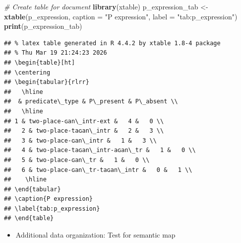\documentclass[
]{article}
\newenvironment{Shaded}{\begin{snugshade}}{\end{snugshade}}
\newcommand{\AttributeTok}[1]{\textcolor[rgb]{0.13,0.29,0.53}{#1}}
\newcommand{\CommentTok}[1]{\textcolor[rgb]{0.56,0.35,0.01}{\textit{#1}}}
\newcommand{\FunctionTok}[1]{\textcolor[rgb]{0.13,0.29,0.53}{\textbf{#1}}}
\newcommand{\NormalTok}[1]{#1}
\newcommand{\OtherTok}[1]{\textcolor[rgb]{0.56,0.35,0.01}{#1}}
\newcommand{\StringTok}[1]{\textcolor[rgb]{0.31,0.60,0.02}{#1}}
\providecommand{\tightlist}{%
  \setlength{\itemsep}{0pt}\setlength{\parskip}{0pt}}
\begin{document}
\begin{Shaded}
\begin{Highlighting}[]
\CommentTok{\# Create table for document}
\FunctionTok{library}\NormalTok{(xtable) }
\NormalTok{p\_expression\_tab }\OtherTok{\textless{}{-}} \FunctionTok{xtable}\NormalTok{(p\_expression,}
             \AttributeTok{caption =} \StringTok{"P expression"}\NormalTok{,}
             \AttributeTok{label   =} \StringTok{"tab:p\_expression"}\NormalTok{)}
\FunctionTok{print}\NormalTok{(p\_expression\_tab)}
\end{Highlighting}
\end{Shaded}

\begin{verbatim}
## % latex table generated in R 4.4.2 by xtable 1.8-4 package
## % Thu Mar 19 21:24:23 2026
## \begin{table}[ht]
## \centering
## \begin{tabular}{rlrr}
##   \hline
##  & predicate\_type & P\_present & P\_absent \\ 
##   \hline
## 1 & two-place-ɢan\_intr-ext &   4 &   0 \\ 
##   2 & two-place-taɢan\_intr &   2 &   3 \\ 
##   3 & two-place-ɢan\_intr &   1 &   3 \\ 
##   4 & two-place-taɢan\_intr-aɢan\_tr &   1 &   0 \\ 
##   5 & two-place-ɢan\_tr &   1 &   0 \\ 
##   6 & two-place-ɢan\_tr-taɢan\_intr &   0 &   1 \\ 
##    \hline
## \end{tabular}
## \caption{P expression} 
## \label{tab:p_expression}
## \end{table}
\end{verbatim}

\begin{itemize}
\tightlist
\item
  Additional data organization: Test for semantic map
\end{itemize}
\end{document}
